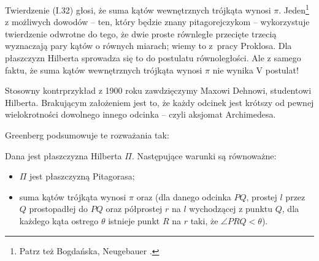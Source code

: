 Twierdzenie (I.32) głosi, że suma kątów wewnętrznych trójkąta wynosi $\pi$.
%
Jeden\footnote{Patrz też Bogdańska, Neugebauer \cite[s. 7]{neugebauer_2018}.} z możliwych dowodów -- ten, który będzie znany pitagorejczykom -- wykorzystuje twierdzenie odwrotne do tego, że dwie proste równległe przecięte trzecią wyznaczają pary kątów o równych miarach; wiemy to z~pracy Proklosa.
Dla płaszczyzn Hilberta sprowadza się to do postulatu równoległości.
Ale z samego faktu, że suma kątów wewnętrznych trójkąta wynosi $\pi$ nie wynika V postulat!
%
%
%
%
%

Stosowny kontrprzykład z 1900 roku zawdzięczymy Maxowi Dehnowi, studentowi Hilberta.
%
Brakującym założeniem jest to, że każdy odcinek jest krótszy od pewnej wielokrotności dowolnego innego odcinka -- czyli aksjomat Archimedesa.
%

Greenberg podsumowuje te rozważania tak:

\begin{proposition}
    Dana jest płaszczyzna Hilberta $\Pi$.
    Następujące warunki są równoważne:
    \begin{itemize}
        \item $\Pi$ jest płaszczyzną Pitagorasa;
        \item suma kątów trójkąta wynosi $\pi$ oraz (dla danego odcinka $PQ$, prostej $l$ przez $Q$ prostopadłej do $PQ$ oraz półprostej $r$ na $l$ wychodzącej z punktu $Q$, dla każdego kąta ostrego $\theta$ istnieje punkt $R$ na $r$ taki, że $\angle PRQ < \theta$).
    \end{itemize}
\end{proposition}

%